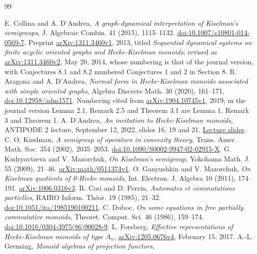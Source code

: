 \documentclass[11pt]{article}
\begin{document}
\begin{thebibliography}{99}\small\raggedright
{} E. Collina and A. D'Andrea,
\emph{A graph-dynamical interpretation of Kiselman's semigroups},
J. Algebraic Combin. 41 (2015), 1115--1132.
\href{https://doi.org/10.1007/s10801-014-0569-7}{doi:10.1007/s10801-014-0569-7}.
Preprint \href{https://arxiv.org/abs/1311.3460v1}{arXiv:1311.3460v1}, 2013,
titled \emph{Sequential dynamical systems on finite acyclic oriented graphs
and Hecke-Kiselman monoids}; revised as
\href{https://arxiv.org/abs/1311.3460v2}{arXiv:1311.3460v2}, May 20, 2014,
whose numbering is that of the journal version, with Conjectures 8.1 and 8.2
numbered Conjectures 1 and 2 in Section 8.
 R. Aragona and A. D'Andrea,
\emph{Normal form in Hecke-Kiselman monoids associated with simple oriented graphs},
Algebra Discrete Math. 30 (2020), 161--171, \href{https://doi.org/10.12958/adm1571}{doi:10.12958/adm1571}.
Numbering cited from \href{https://arxiv.org/abs/1904.10745v1}{arXiv:1904.10745v1}, 2019;
in the journal version Lemma 2.1, Remark 2.5 and Theorem 3.1 are Lemma 1,
Remark 3 and Theorem 1.
 A. D'Andrea, \emph{An invitation to Hecke-Kiselman monoids}, ANTIPODE 2 lecture,
September 12, 2022, slides 16, 19 and 21.
\href{https://hopfalgb.ulb.be/ANTIPODE2/Presentations/DAndrea.pdf}{Lecture slides}.
 C. O. Kiselman,
\emph{A semigroup of operators in convexity theory},
Trans. Amer. Math. Soc. 354 (2002), 2035--2053.
\href{https://doi.org/10.1090/S0002-9947-02-02915-X}{doi:10.1090/S0002-9947-02-02915-X}.
 G. Kudryavtseva and V. Mazorchuk,
\emph{On Kiselman's semigroup},
Yokohama Math. J. 55 (2009), 21--46.
\href{https://arxiv.org/abs/math/0511374v1}{arXiv:math/0511374v1}.
 O. Ganyushkin and V. Mazorchuk,
\emph{On Kiselman quotients of 0-Hecke monoids},
Int. Electron. J. Algebra 10 (2011), 174--191.
\href{https://arxiv.org/abs/1006.0316v3}{arXiv:1006.0316v3}.
 R. Cori and D. Perrin,
\emph{Automates et commutations partielles},
RAIRO Inform. Th\'eor. 19 (1985), 21--32.
\href{https://doi.org/10.1051/ita/1985190100211}{doi:10.1051/ita/1985190100211}.
 C. Duboc,
\emph{On some equations in free partially commutative monoids},
Theoret. Comput. Sci. 46 (1986), 159--174.
\href{https://doi.org/10.1016/0304-3975(86)90028-9}{doi:10.1016/0304-3975(86)90028-9}.
 L. Forsberg,
\emph{Effective representations of Hecke-Kiselman monoids of type $A_n$},
\href{https://arxiv.org/abs/1205.0676v4}{arXiv:1205.0676v4}, February 15, 2017.
 A.-L. Grensing,
\emph{Monoid algebras of projection functors},

\end{thebibliography}
\end{document}
